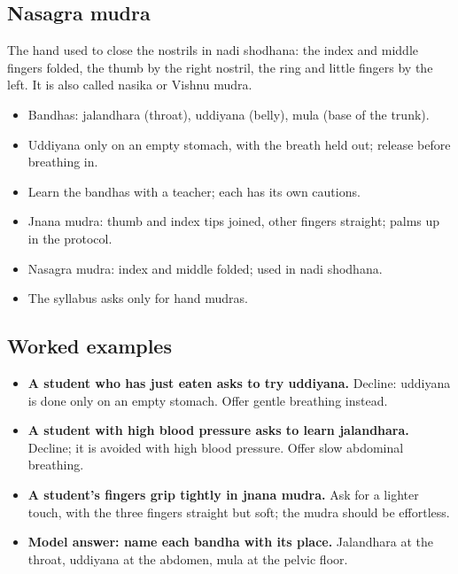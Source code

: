 \subsection*{Nasagra mudra}
The hand used to close the nostrils in nadi shodhana: the index and middle fingers folded, the thumb by the right nostril, the ring and little fingers by the left. It is also called nasika or Vishnu mudra.


\begin{recall}
\begin{itemize}
\item Bandhas: jalandhara (throat), uddiyana (belly), mula (base of the trunk).
\item Uddiyana only on an empty stomach, with the breath held out; release before breathing in.
\item Learn the bandhas with a teacher; each has its own cautions.
\item Jnana mudra: thumb and index tips joined, other fingers straight; palms up in the protocol.
\item Nasagra mudra: index and middle folded; used in nadi shodhana.
\item The syllabus asks only for hand mudras.
\end{itemize}
\end{recall}

\subsection*{Worked examples}
\begin{itemize}
\item \textbf{A student who has just eaten asks to try uddiyana.} Decline: uddiyana is done only on an empty stomach. Offer gentle breathing instead.
\item \textbf{A student with high blood pressure asks to learn jalandhara.} Decline; it is avoided with high blood pressure. Offer slow abdominal breathing.
\item \textbf{A student's fingers grip tightly in jnana mudra.} Ask for a lighter touch, with the three fingers straight but soft; the mudra should be effortless.
\item \textbf{Model answer: name each bandha with its place.} Jalandhara at the throat, uddiyana at the abdomen, mula at the pelvic floor.
\end{itemize}

